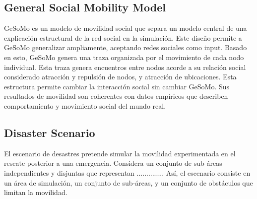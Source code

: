 \subsection{General Social Mobility Model}

GeSoMo es un modelo de movilidad social que separa un modelo central de una explicación estructural de la red social en la simulación. Este diseño permite a GeSoMo generalizar ampliamente, aceptando redes sociales como input. Basado en esto, GeSoMo genera una traza organizada por el movimiento de cada nodo individual. Esta traza genera encuentros entre nodos acorde a su relación social considerado atracción y repulsión de nodos, y atracción de ubicaciones. Esta estructura permite cambiar la interacción social sin cambiar GeSoMo. Sus resultados de movilidad son coherentes con datos empíricos que describen comportamiento y movimiento social del mundo real.

\subsection{Disaster Scenario}

El escenario de desastres pretende simular la movilidad experimentada en el rescate posterior a una emergencia. Considera un conjunto de sub áreas independientes y disjuntas que representan .............. Así, el escenario consiste en un área de simulación, un conjunto de sub-áreas, y un conjunto de obstáculos que limitan la movilidad. 
